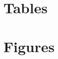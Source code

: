 \documentclass[12pt,english]{article}
\begin{document}
\pagebreak
\begingroup
{}
\setlength\bibitemsep{0pt}
\printbibliography
\endgroup
\pagebreak

\begin{appendices}

\section{Tables}\label{appendix:tabs}



\pagebreak
\newpage

\section{Figures}\label{appendix:figs}




\end{appendices}
\end{document}
